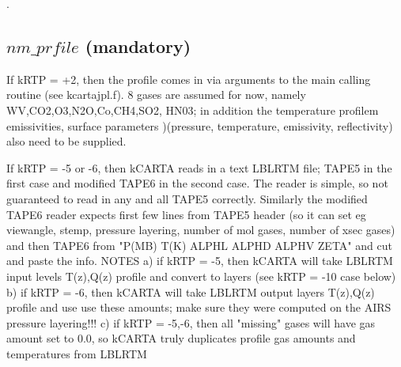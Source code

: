 \documentclass[12pt]{article}
\newcommand{\ttab}{\indent\indent}
\begin{document}
{\medskip
\ttab {\sf iN = iNumGases = iNgas + iNxsec}. 

\subsection{$nm\_prfile$ (mandatory)}

\label{inprofile}

If kRTP = +2, then the profile comes in via arguments to the main calling routine (see kcartajpl.f).
8 gases are assumed for now, namely WV,CO2,O3,N2O,Co,CH4,SO2, HN03; in addition the temperature
profilem emissivities, surface parameters )(pressure, temperature, emissivity, reflectivity) also
need to be supplied.

If kRTP = -5 or -6, then kCARTA reads in a text LBLRTM file; TAPE5 in the first case and
modified TAPE6 in the second case. The reader is simple, so not guaranteed to read in 
any and all TAPE5 correctly. Similarly the modified TAPE6 reader expects first few lines
from TAPE5 header (so it can set eg viewangle, stemp, pressure layering, number of
mol gases, number of xsec gases) and then TAPE6 from \newline
  "P(MB)       T(K)    ALPHL    ALPHD    ALPHV   ZETA" \newline
and cut and paste the info. NOTES  \newline
a) if kRTP = -5, then kCARTA will take LBLRTM input levels T(z),Q(z) profile and convert to 
layers (see kRTP = -10 case below) \newline
b) if kRTP = -6, then kCARTA will take LBLRTM output layers T(z),Q(z) profile and use use 
these amounts; make sure they were computed on the AIRS pressure layering!!! \newline
c) if kRTP = -5,-6, then all "missing" gases will have
gas amount set to 0.0, so kCARTA truly duplicates profile gas amounts and temperatures 
from LBLRTM\newline

}
\end{document}
